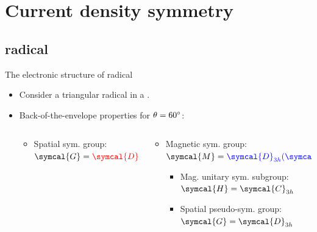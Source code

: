 \section{Current density symmetry}

  \subsection{ radical}
  \begin{frame}{The electronic structure of  radical}
    \begin{itemize}
      \item<1-> Consider a triangular  radical in a .
      \begin{figure}
        \centering
        \scalebox{.8}{}
      \end{figure}

      \item<2-> Back-of-the-envelope properties for $\theta = 60\degree$:
      \begin{columns}[T]
        \begin{column}{.40\textwidth}
          \begin{itemize}
            \item<2-> Spatial sym. group: $\symcal{G} = \textcolor{red}{\symcal{D}_{3h}}$
          \end{itemize}
        \end{column}
        \begin{column}{.50\textwidth}
          \begin{itemize}
            \item<2-> Magnetic sym. group: $\symcal{M} = \textcolor{blue}{\symcal{D}_{3h}(\symcal{C}_{3h})}$
            \begin{itemize}
              \item Mag. unitary sym. subgroup: $\symcal{H} = \symcal{C}_{3h}$
              \item Spatial pseudo-sym. group: $\symcal{G} = \symcal{D}_{3h}$
            \end{itemize}
          \end{itemize}
        \end{column}
      \end{columns}

      \vspace{6	pt}


\end{itemize}
\end{frame}
